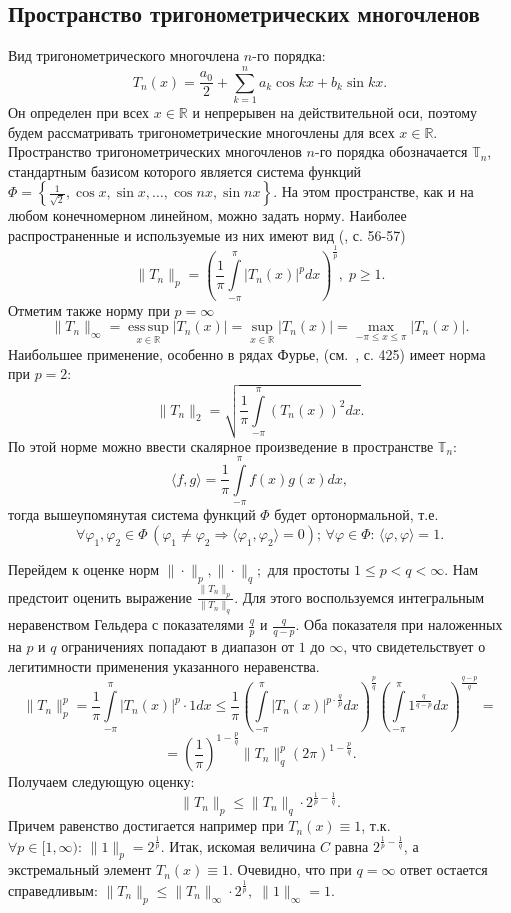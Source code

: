 \documentclass{article}
\DeclareMathOperator*{\esssup}{ess\,sup}
\begin{document}
\subsection{Пространство тригонометрических многочленов}
Вид тригонометрического многочлена $n$-го порядка: 
$$T_n(x) = \frac{a_0}{2} + \sum\limits_{k=1}^n {a_k\cos{kx} + b_k\sin{kx}}.$$
Он определен при всех $x \in \mathbb{R}$ и непрерывен на действительной оси, поэтому будем рассматривать тригонометрические многочлены для всех $x \in \mathbb{R}$. Пространство тригонометрических многочленов $n$-го порядка обозначается $\mathbb{T}_n$, стандартным базисом которого является система функций $\Phi = \left\{\frac{1}{\sqrt{2}},\cos{x},\sin{x},\ldots,\cos{nx},\sin{nx}\right\}$. На этом пространстве, как и на любом конечномерном линейном, можно задать норму. Наиболее распространенные и используемые из них имеют вид (\cite{Tikhomirov}, с. 56-57)
$$ \|T_n\|_p = \left(\frac{1}{\pi}\int\limits_{-\pi}^{\pi}{|T_n(x)|^pdx} \right)^{\frac{1}{p}}, \; p \geqslant 1. $$
Отметим также норму при $p=\infty$
$$ \|T_n\|_{\infty} = \esssup\limits_{x \in \mathbb{R}} {|T_n(x)|} = \sup\limits_{x \in \mathbb{R}} {|T_n(x)|} = \max\limits_{-\pi \leqslant x \leqslant \pi} {|T_n(x)|}. $$
Наибольшее применение, особенно в рядах Фурье, (см.~\cite{Kolmogorov}, с. 425) имеет норма при $p = 2$:
$$ \|T_n\|_2 = \sqrt{\frac{1}{\pi}\int\limits_{-\pi}^{\pi}{(T_n(x))^2dx}}. $$
По этой норме можно ввести скалярное произведение в пространстве $\mathbb{T}_n$:
$$ \langle f, g \rangle = \frac{1}{\pi}\int\limits_{-\pi}^{\pi}{f(x)g(x)dx}, $$
тогда вышеупомянутая система функций $\Phi$ будет ортонормальной, т.е. 
$$\forall{\varphi_1,\varphi_2 \in \Phi} \, (\varphi_1 \neq \varphi_2 \Rightarrow \langle \varphi_1, \varphi_2\rangle = 0); \, \forall{\varphi \in \Phi}: \, \langle \varphi, \varphi \rangle = 1.$$

\vspace{3mm}
Перейдем к оценке норм $\|{\cdot}\|_p, \|{\cdot}\|_q; \text{ для простоты } 1 \leqslant p < q < \infty$. Нам предстоит оценить выражение $\frac{\|T_n\|_p}{\|T_n\|_q}$. Для этого воспользуемся интегральным неравенством Гельдера с показателями $\frac{q}{p}$ и $\frac{q}{q-p}$. Оба показателя при наложенных на $p$ и $q$ ограничениях попадают в диапазон от $1$ до $\infty$, что свидетельствует о легитимности применения указанного неравенства.
$$ \|T_n\|_p^p = \frac{1}{\pi}\int\limits_{-\pi}^{\pi}{|T_n(x)|^p \cdot 1dx} \leqslant \frac{1}{\pi}\left(\int\limits_{-\pi}^{\pi}{|T_n(x)|^{p\cdot\frac{q}{p}}dx}\right)^{\frac{p}{q}}\left(\int\limits_{-\pi}^{\pi}{1^{\frac{q}{q-p}}dx}\right)^{\frac{q-p}{q}} = $$
$$ = \left(\frac{1}{\pi}\right)^{1-\frac{p}{q}}\|T_n\|_q^p\left(2\pi\right)^{1-\frac{p}{q}}. $$
Получаем следующую оценку:
$$ \|T_n\|_p \leqslant \|T_n\|_q\cdot 2^{\frac{1}{p}-\frac{1}{q}}. $$
Причем равенство достигается например при $T_n(x) \equiv 1$, т.к. $\forall{p \in [1,\infty)}: \, \|1\|_p = 2^{\frac{1}{p}}$.
\newline
Итак, искомая величина $C$ равна $ 2^{\frac{1}{p}-\frac{1}{q}}$, а экстремальный элемент $T_n(x) \equiv 1$. Очевидно, что при $q=\infty$ ответ остается справедливым: $\|T_n\|_p \leqslant \|T_n\|_{\infty} \cdot 2^{\frac{1}{p}}, \; \|1\|_{\infty} = 1$.
\end{document}

